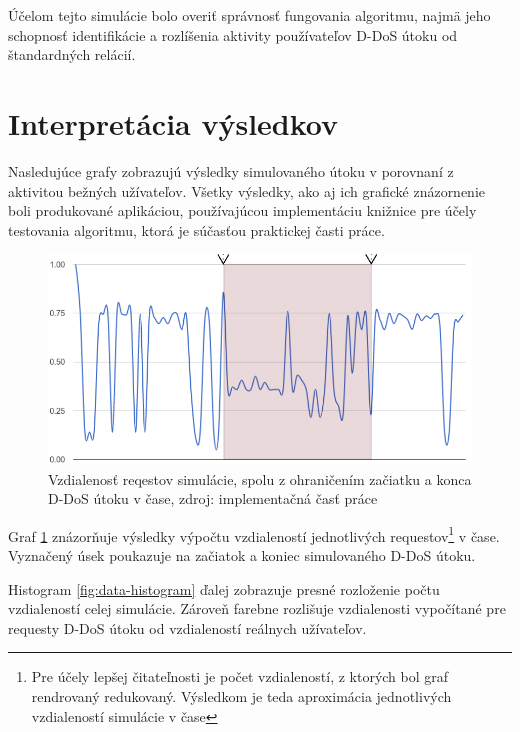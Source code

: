 \documentclass[
  digital, %
  table,   %
  lof,     %
  nolot,   %
  nocover
]{fithesis3}
\begin{document}
Účelom tejto simulácie bolo overiť správnosť fungovania algoritmu, najmä jeho
schopnosť identifikácie a rozlíšenia aktivity používateľov D-DoS útoku od
štandardných relácií.

\section{Interpretácia výsledkov}
Nasledujúce grafy zobrazujú výsledky simulovaného útoku v porovnaní z aktivitou
bežných užívateľov. Všetky výsledky, ako aj ich grafické znázornenie boli
produkované aplikáciou, používajúcou implementáciu knižnice pre účely testovania
algoritmu, ktorá je súčasťou praktickej časti práce.

\begin{figure}[H]
  \centering
    \includegraphics[width=.95\textwidth]{images/data-flow.png}
  \caption{Vzdialenosť reqestov simulácie, spolu z ohraničením začiatku a konca
  D-DoS útoku v čase, zdroj: implementačná časť práce}
  \label{fig:data-flow}
\end{figure}

Graf \ref{fig:data-flow} znázorňuje výsledky výpočtu vzdialeností jednotlivých
requestov\footnote{Pre účely lepšej čitateľnosti je počet vzdialeností, z
ktorých bol graf rendrovaný redukovaný. Výsledkom je teda aproximácia
jednotlivých vzdialeností simulácie v čase} v čase. Vyznačený úsek poukazuje na
začiatok a koniec simulovaného D-DoS útoku.

Histogram \ref{fig:data-histogram} ďalej zobrazuje presné rozloženie počtu
vzdialeností celej simulácie. Zároveň farebne rozlišuje vzdialenosti vypočítané
pre requesty D-DoS útoku od vzdialeností reálnych užívateľov. 
\end{document}
